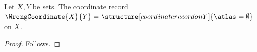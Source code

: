 

\begin{construction}\label{wrong_coordinate_parameter}
    Let $X,Y$ be sets.
    The coordinate record $\WrongCoordinate{X}{Y}=
        \structure[coordinate record on Y]{\atlas=\emptyset}$ on $X$.
\end{construction}
\begin{proof}
    Follows.
\end{proof}
